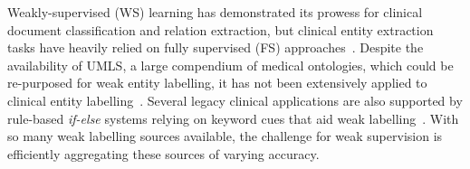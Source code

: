 \documentclass[10.7pt,]{article}
\begin{document}
Weakly-supervised (WS) learning has demonstrated its prowess for clinical document classification and relation extraction, but clinical entity extraction tasks have heavily relied on fully supervised (FS) approaches~\cite{meng2018weakly,wang2019clinical,mintz2009distant,elangovan2020assigning,weber2020pedl,mallory2020extracting}.
Despite the availability of UMLS, a large compendium of medical ontologies, which could be re-purposed for weak entity labelling, it has not been extensively applied to clinical entity labelling~\cite{humphreys1998unified}.
Several legacy clinical applications are also supported by rule-based \textit{if-else} systems relying on keyword cues that aid weak labelling~\cite{friedlin2008software,kim2017extracting,yang2015automatic}.
With so many weak labelling sources available, the challenge for weak supervision is efficiently aggregating these sources of varying accuracy.
\end{document}
